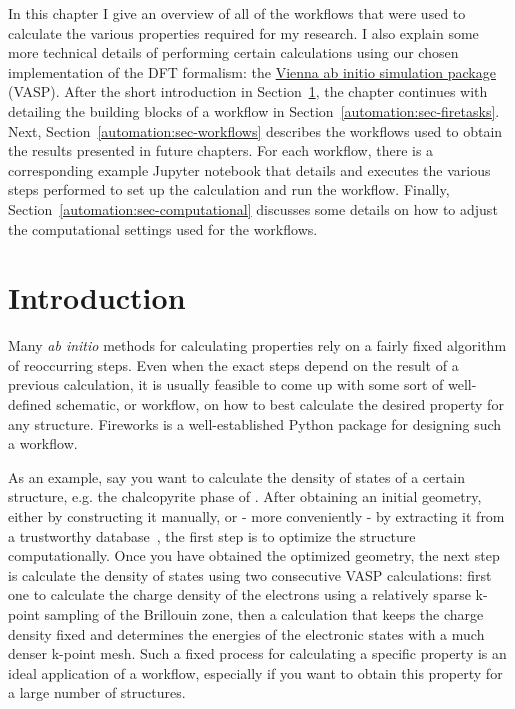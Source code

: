 \begin{refsection}
In this chapter I give an overview of all of the workflows that were used to 
calculate the various properties required for my research. I also explain some 
more technical details of performing certain calculations using our chosen 
implementation of the \gls{DFT} formalism: the \href{https://www.vasp.at/}{Vienna ab 
initio simulation package} (\gls{VASP}). After the short introduction in 
Section~\ref{automation:sec-intro}, the chapter continues with detailing the 
building blocks of a workflow in Section~\ref{automation:sec-firetasks}. Next, 
Section~\ref{automation:sec-workflows} describes the workflows used to obtain 
the results presented in future chapters. For each workflow, there is a 
corresponding example Jupyter notebook that details and executes the various 
steps performed to set up the calculation and run the workflow. Finally, 
Section~\ref{automation:sec-computational} discusses some details on how to  
adjust the computational settings used for the workflows. 
 
\pagebreak 
 
\section{Introduction} \label{automation:sec-intro} 
 
Many \textit{ab initio} methods for calculating properties rely on a fairly 
fixed algorithm of reoccurring steps. Even when the exact steps depend on the 
result of a previous calculation, it is usually feasible to come up with some 
sort of well-defined schematic, or workflow, on how to best calculate the 
desired property for any structure. Fireworks is a well-established Python 
package for designing such a workflow. 
 
As an example, say you want to calculate the density of states of a certain 
structure, e.g. the chalcopyrite phase of . After obtaining an 
initial geometry, either by constructing it manually, or - more conveniently - 
by extracting it from a trustworthy database~\cite{Jain2013}, the first step 
is to optimize the structure computationally. Once you have obtained the 
optimized geometry, the next step is calculate the density of states using two 
consecutive \gls{VASP} calculations: first one to calculate the charge 
density of the electrons using a relatively sparse k-point sampling of the 
Brillouin zone, then a calculation that keeps the charge density fixed and 
determines the energies of the electronic states with a much denser k-point 
mesh. Such a fixed process for calculating a specific property is an ideal 
application of a workflow, especially if you want to obtain this property for 
a large number of structures.  
 

\end{refsection}
